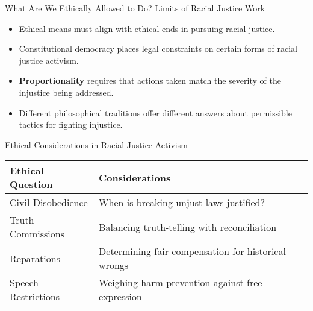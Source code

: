 \documentclass{beamer}
\begin{document}
	\begin{frame}{What Are We Ethically Allowed to Do? Limits of Racial Justice Work}
		\begin{itemize}
			\item Ethical means must align with ethical ends in pursuing racial justice.
			\item Constitutional democracy places legal constraints on certain forms of racial justice activism.
			\item \textbf{Proportionality} requires that actions taken match the severity of the injustice being addressed.
			\item Different philosophical traditions offer different answers about permissible tactics for fighting injustice.
		\end{itemize}
		
		\begin{exampleblock}{Ethical Considerations in Racial Justice Activism}
			\begin{tabular}{|l|l|}
				\hline
				\textbf{Ethical Question} & \textbf{Considerations} \\
				\hline
				Civil Disobedience & When is breaking unjust laws justified? \\
				Truth Commissions & Balancing truth-telling with reconciliation \\
				Reparations & Determining fair compensation for historical wrongs \\
				Speech Restrictions & Weighing harm prevention against free expression \\
				\hline
			\end{tabular}
		\end{exampleblock}
	\end{frame}
	
	
\end{document}
